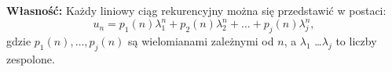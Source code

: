 \documentclass[leqno,10pt]{article}
\def\marg#1{\marginpar{\scriptsize\raggedright#1}}
\begin{document}
\textbf{Własność:}
Każdy liniowy ciąg rekurencyjny można się przedstawić w postaci:
$$
u_n = p_1(n) \lambda_1^n + p_2(n) \lambda_2^n + … + p_j(n) \lambda_j^n,
$$
gdzie $p_1(n), \ldots, p_j(n)$ są  wielomianami zależnymi od $n$, a $\lambda_1$ \ldots $\lambda_j$ to liczby zespolone. 


\end{document}

